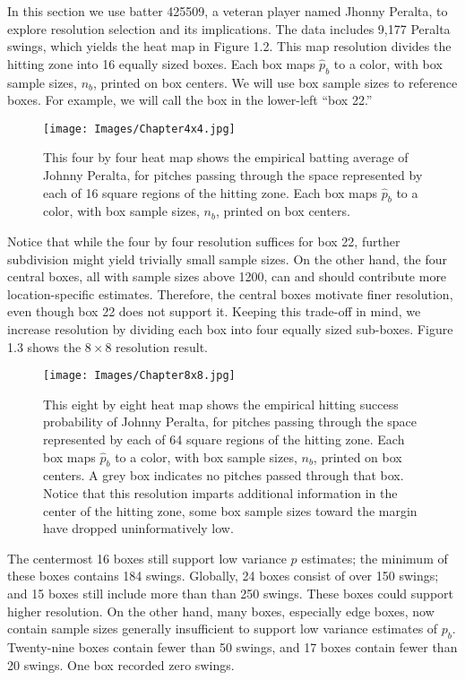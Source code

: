 In this section we use batter 425509, a veteran player named Jhonny Peralta, to explore resolution selection and its implications. The data includes 9,177 Peralta swings, which yields the heat map in Figure 1.2. This map resolution divides the hitting zone into 16 equally sized boxes. Each box maps $\hat{p}_{b}$ to a color, with box sample sizes, $n_{b}$, printed on box centers. We will use box sample sizes to reference boxes. For example, we will call the box in the lower-left ``box 22.'' 
        \begin{figure}[H]
      	\centering
      	\texttt{[image: Images/Chapter4x4.jpg]} 
      	\caption{This four by four heat map shows the empirical batting average of Johnny Peralta, for pitches passing through the space represented by each of 16 square regions of the hitting zone. Each box maps $\hat{p}_{b}$ to a color, with box sample sizes, $n_{b}$, printed on box centers.}
      	\end{figure} 

Notice that while the four by four resolution suffices for box 22, further subdivision might yield trivially small sample sizes. On the other hand, the four central boxes, all with sample sizes above 1200, can and should contribute more location-specific estimates. Therefore, the central boxes motivate finer resolution, even though box 22 does not support it. Keeping this trade-off in mind, we increase resolution by dividing each box into four equally sized sub-boxes. Figure 1.3 shows the $8 \times 8$ resolution result.
        \begin{figure}[H]
      	\centering
      	\texttt{[image: Images/Chapter8x8.jpg]} 
      	\caption{This eight by eight heat map shows the empirical hitting success probability of Johnny Peralta, for pitches passing through the space represented by each of 64 square regions of the hitting zone. Each box maps $\hat{p}_{b}$ to a color, with box sample sizes, $n_{b}$, printed on box centers. A grey box indicates no pitches passed through that box. Notice that this resolution imparts additional information in the center of the hitting zone, some box sample sizes toward the margin have dropped uninformatively low.}
      	\end{figure} 
The centermost 16 boxes still support low variance $p$ estimates; the minimum of these boxes contains 184 swings. Globally, 24 boxes consist of over 150 swings; and 15 boxes still include more than than 250 swings. These boxes could support higher resolution. On the other hand, many boxes, especially edge boxes, now contain sample sizes generally insufficient to support low variance estimates of $p_{b}$. Twenty-nine boxes contain fewer than 50 swings, and 17 boxes contain fewer than 20 swings. One box recorded zero swings.

